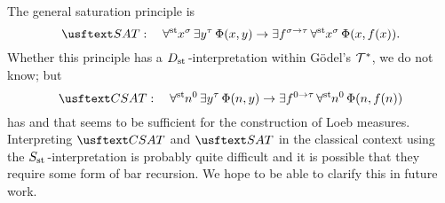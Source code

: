 The general saturation principle is
\[ \SAT: \quad \forallst x^\sigma \, \exists y^\tau \, \Phi(x, y) \to \exists f^{\sigma \to \tau} \, \forallst x^\sigma \, \Phi(x, f(x)). \]
Whether this principle has a $\protect{D_{\operatorname{st}{}}}$-interpretation within G\"odel's $\mathcal{T}^*$, we do not know; but
\[ \CSAT: \quad \forallst n^0 \, \exists y^\tau \, \Phi(n, y) \to \exists f^{0 \to \tau} \, \forallst n^0 \, \Phi(n, f(n)) \]
has and that seems to be sufficient for the construction of Loeb measures. Interpreting $\CSAT$ and $\SAT$ in the classical context using the $\protect{S_{\operatorname{st}{}}}$-interpretation is probably quite difficult and it is possible that they require some form of bar recursion. We hope to be able to clarify this in future work.
